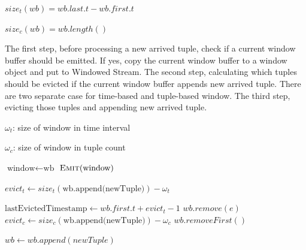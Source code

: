 $size_{t}(wb) = wb.last.t - wb.first.t$

$size_c(wb) = wb.length()$


\begin{algorithm}
\caption{Process new arrived tuple}
\label{algorithm:processNewTuple}
The first step, before processing a new arrived tuple, check if a current window buffer should be emitted. If yes, copy the current window buffer to a window object and put to Windowed Stream. The second step, calculating which tuples should be evicted if the current window buffer appends new arrived tuple. There are two separate case for time-based and tuple-based window. The third step, evicting those tuples and appending new arrived tuple.


\algrenewcommand{}
\algrenewcommand{}
  \begin{algorithmic}[1]
  	
  			{$\omega_t$: size of window in time interval }
  			
  			{$\omega_c$: size of window in tuple count }
    
     
    		\State $\textrm{window} \gets \textrm{wb}$
    		\State $\textsc{Emit}(\textrm{window})$ 
    \EndIf
    
    		\State $ evict_t \gets size_t (\textrm{wb.append(newTuple)}) - \omega_t$
    
    		 
    			\State $ \textrm{lastEvictedTimestamp} \gets wb.first.t + evict_t - 1$
    					\State $wb.remove(e)$
    				\EndIf
    			\EndFor
    		\EndIf
    \Else {}
    		\State $evict_c \gets size_c(\textrm{wb.append(newTuple)}) - \omega_c$
    		 
    				\State $wb.removeFirst()$
    			\EndFor
    		\EndIf
    \EndIf
    
   	\State $wb \gets wb.append(newTuple)$ 
    
    
    \EndProcedure
  \end{algorithmic}
  




\end{algorithm}


